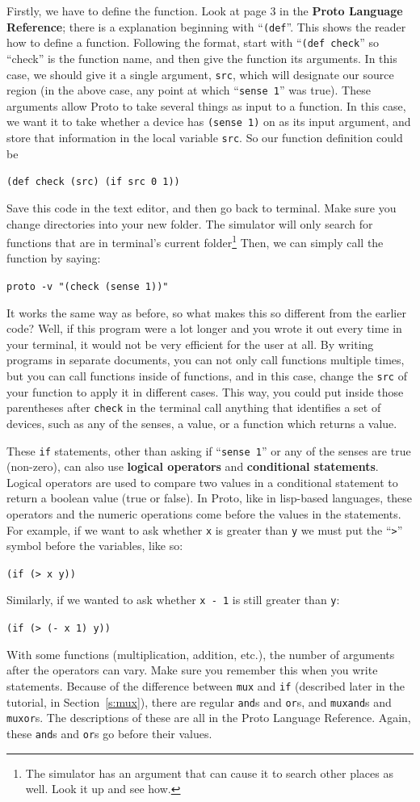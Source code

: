 \documentclass{article}
\newcommand\code[1]{\begin{center}\var{#1}\end{center}}
\newcommand\var[1]{{\tt #1}}
\newcommand\qvar[1]{``{\tt #1}''}
\begin{document}
Firstly, we have to define the function.  Look at page 3 in the {\bf
  Proto Language Reference}; there is a explanation beginning with
\qvar{(def}.  This shows the reader how to define a function.
Following the format, start with \qvar{(def check} so ``check'' is the
function name, and then give the function its arguments.  In this
case, we should give it a single argument, \var{src}, which will
designate our source region (in the above case, any point at which
\qvar{sense 1} was true).  These arguments allow Proto to take several
things as input to a function.  In this case, we want it to take
whether a device has \var{(sense 1)} on as its input argument, and store
that information in the local variable \var{src}. So our function definition
could be \code{(def check (src) (if src 0 1))}

Save this code in the text editor, and then go back to terminal.  Make
sure you change directories into your new folder.  The simulator will
only search for functions that are in terminal's current
folder\footnote{The simulator has an argument that can cause it to
  search other places as well.  Look it up and see how.}  Then, we can
simply call the function by saying:

\code{proto -v "(check (sense 1))"}

It works the same way as before, so what makes this so different from
the earlier code?  Well, if this program were a lot longer and you
wrote it out every time in your terminal, it would not be very
efficient for the user at all.  By writing programs in separate
documents, you can not only call functions multiple times, but you can
call functions inside of functions, and in this case, change the
\var{src} of your function to apply it in different cases.  This way,
you could put inside those parentheses after \var{check} in the
terminal call anything that identifies a set of devices, such as any
of the senses, a value, or a function which returns a value.

These \var{if} statements, other than asking if \qvar{sense 1} or any
of the senses are true (non-zero), can also use {\bf logical
  operators} and {\bf conditional statements}.  Logical operators are
used to compare two values in a conditional statement to return a
boolean value (true or false).  In Proto, like in lisp-based
languages, these operators and the numeric operations come before the
values in the statements.  For example, if we want to ask whether
\var{x} is greater than \var{y} we must put the \qvar{>} symbol
before the variables, like so: \code{(if (> x y))}  Similarly, if we
wanted to ask whether \var{x - 1} is still greater than \var{y}:
\code{(if (> (- x 1) y))} With some functions (multiplication,
addition, etc.), the number of arguments after the operators can vary.
Make sure you remember this when you write statements.  Because of the
difference between \var{mux} and \var{if} (described later in the
tutorial, in Section~\ref{s:mux}), there are regular \var{and}s and
\var{or}s, and \var{muxand}s and \var{muxor}s.  The descriptions of
these are all in the Proto Language Reference.  Again, these
\var{and}s and \var{or}s go before their values.
\end{document}
